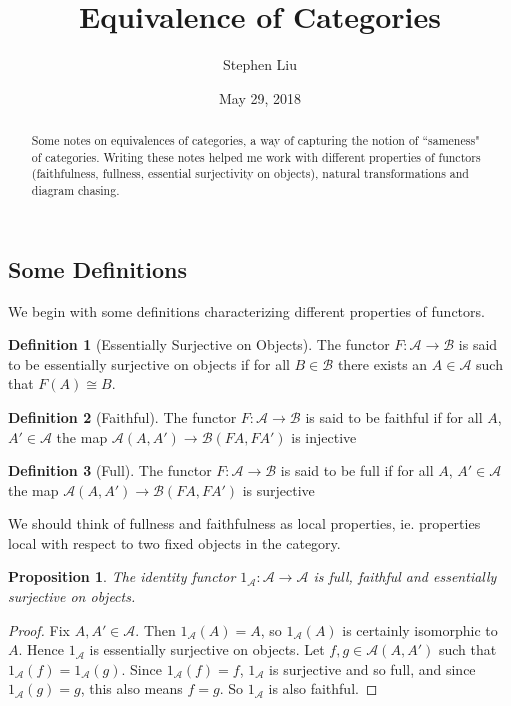 \documentclass[11pt]{article}
\theoremstyle{definition}
\newtheorem*{defn}{Definition}
\theoremstyle{plain}
\theoremstyle{plain}
\newtheorem{prop}{Proposition}
\theoremstyle{plain}
\begin{document}
\author{Stephen Liu}
\title{Equivalence of Categories}
\date{May 29, 2018}

\maketitle

\begin{abstract}
Some notes on equivalences of categories, a way of capturing the notion of ``sameness" of categories. Writing these notes helped me work with different properties of functors (faithfulness, fullness, essential surjectivity on objects), natural transformations and diagram chasing.
\end{abstract}

\subsection*{Some Definitions}

We begin with some definitions characterizing different properties of functors.

\begin{defn}[Essentially Surjective on Objects]
The functor $F:\mathscr{A}\to\mathscr{B}$ is said to be essentially surjective on objects if for all $B\in\mathscr{B} $ there exists an $A\in\mathscr{A}$ such that $F(A)\cong B$.
\end{defn}

\begin{defn}[Faithful]
The functor $F:\mathscr{A}\to\mathscr{B}$ is said to be faithful if for all $A$, $A' \in \mathscr{A}$ the map $\mathscr{A}(A, A') \to \mathscr{B}(FA, FA')$ is injective
\end{defn}

\begin{defn}[Full]
The functor $F:\mathscr{A}\to\mathscr{B}$ is said to be full if for all $A$, $A' \in \mathscr{A}$ the map $\mathscr{A}(A, A') \to \mathscr{B}(FA, FA')$ is surjective
\end{defn}

We should think of fullness and faithfulness as local properties, ie. properties local with respect to two fixed objects in the category.

\begin{prop}
The identity functor $1_{\mathscr{A}}:\mathscr{A}\to\mathscr{A}$ is full, faithful and essentially surjective on objects.
\end{prop}

\begin{proof}
Fix $A,A'\in\mathscr{A}$. Then $1_{\mathscr{A}}(A)=A$, so $1_{\mathscr{A}}(A)$ is certainly isomorphic to $A$. Hence $1_{\mathscr{A}}$ is essentially surjective on objects. Let $f,g\in\mathscr{A}(A,A')$ such that $1_{\mathscr{A}}(f)=1_{\mathscr{A}}(g)$. Since $1_{\mathscr{A}}(f)=f$, $1_{\mathscr{A}}$ is surjective and so full, and since $1_{\mathscr{A}}(g)=g$, this also means $f=g$. So $1_{\mathscr{A}}$ is also faithful. 
\end{proof}
\end{document}
